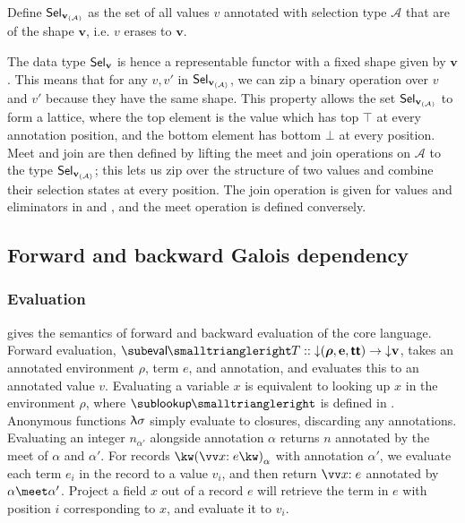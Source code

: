 \begin{definition}
   Define $\textup{\textsf{Sel}}_{{\mathbf{v}}_{(\mathcal{A})}}$ as the set of all values $v$ annotated with selection type $\mathcal{A}$ that are of the shape $\textbf{v}$, i.e. $v$ erases to $\mathbf{v}$.
\end{definition}

The data type $\textup{\textsf{Sel}}_{\mathbf{v}}$ is hence a representable functor with a fixed shape given by $\mathbf{v}$. This means that for any $v, v'$ in $\textup{\textsf{Sel}}_{{\mathbf{v}}_{(\mathcal{A})}}$, we can zip a binary operation over $v$ and $v'$ because they have the same shape. This property allows the set $\textup{\textsf{Sel}}_{{\mathbf{v}}_{(\mathcal{A})}}$ to form a lattice, where the top element is the value which has top $\top$ at every annotation position, and the bottom element has bottom $\bot$ at every position. Meet and join are then defined by lifting the meet and join operations on $\mathcal{A}$ to the type $\textup{\textsf{Sel}}_{{\mathbf{v}}_{(\mathcal{A})}}$; this lets us zip over the structure of two values and combine their selection states at every position. The join operation is given for values and eliminators in  and , and the meet operation is defined conversely.

\subsection{Forward and backward Galois dependency}
\label{sec:core-language:fwd-bwd}

\subsubsection{Evaluation}

 gives the semantics of forward and backward evaluation of the core language. Forward evaluation, $\evalFwdF{T} :: \Below{(\boldsymbol{\rho},\mathbf{e},\boldsymbol{\TT})} \to \Below{\mathbf{v}}$, takes an annotated environment $\rho$, term $e$, and annotation, and evaluates this to an annotated value $v$. Evaluating a variable $x$ is equivalent to looking up $x$ in the environment $\rho$, where $\envLookupFwdF{}$ is defined in . Anonymous functions $\uplambda{\sigma}$ simply evaluate to closures, discarding any annotations. Evaluating an integer $n_{\alpha'}$ alongside annotation $\alpha$ returns $n$ annotated by the meet of $\alpha$ and $\alpha'$. For records $\exRec{\vec{\bind{x}{e}}}_{\alpha}$ with annotation $\alpha'$, we evaluate each term $e_i$ in the record to a value $v_i$, and then return $\vec{\bind{x}{e}}$ annotated by $\alpha \meet \alpha'$. Project a field $x$ out of a record $e$ will retrieve the term in $e$ with position $i$ corresponding to $x$, and evaluate it to $v_i$.

